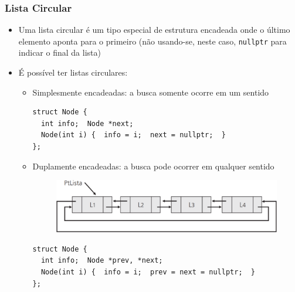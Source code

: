 \documentclass[aspectratio=169]{beamer}
\begin{document}
\begin{frame}[fragile]\frametitle{Lista Circular}
\begin{itemize}
	\item Uma lista circular é um tipo especial de estrutura encadeada onde o último elemento aponta para o primeiro (não usando-se, neste caso, \texttt{nullptr} para indicar o final da lista)
	\item É possível ter listas circulares:
	\begin{itemize}
		\item Simplesmente encadeadas: a busca somente ocorre em um sentido
\begin{lstlisting}[basicstyle=\ttfamily\tiny]
struct Node {
  int info;  Node *next;
  Node(int i) {  info = i;  next = nullptr;  }
};
\end{lstlisting}
		\item Duplamente encadeadas: a busca pode ocorrer em qualquer sentido
\begin{figure}[h]
	\centering
	\includegraphics[height=0.14\paperheight]{imagens/lista_circular_duplamente_encadeada.png}
\end{figure}
\begin{lstlisting}[basicstyle=\ttfamily\tiny]
struct Node {
  int info;  Node *prev, *next;
  Node(int i) {  info = i;  prev = next = nullptr;  }
};
\end{lstlisting}
	\end{itemize}
\end{itemize}
\end{frame}
\end{document}

